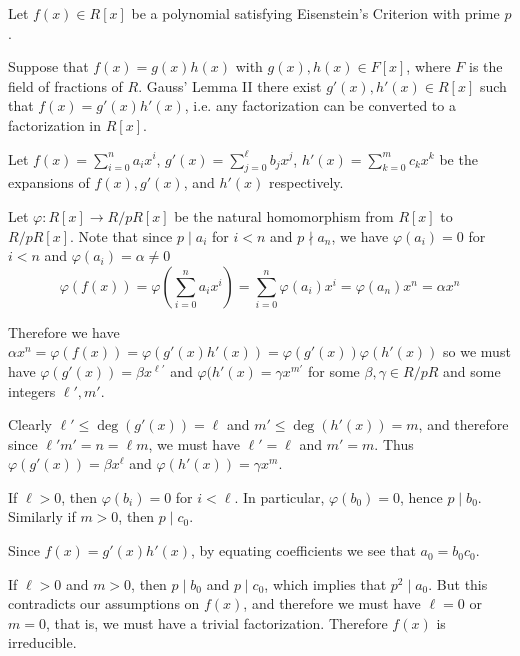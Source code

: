 \documentclass[12pt]{article}
\begin{document}
Let $f(x) \in R[x]$ be a polynomial satisfying Eisenstein's Criterion with prime $p$.

Suppose that $f(x)=g(x)h(x)$ with $g(x), h(x) \in F[x]$, where $F$ is the field of fractions of $R$.  Gauss' Lemma II  there exist $g'(x), h'(x) \in R[x]$ such that $f(x)=g'(x)h'(x)$, i.e. any factorization can be converted to a factorization in $R[x]$.

Let $f(x) = \sum_{i=0}^n a_i x^i$, $g'(x)= \sum_{j=0}^\ell b_j x^j$,
$h'(x)= \sum_{k=0}^m c_k x^k$ be the expansions of $f(x), g'(x)$, and $h'(x)$ respectively.

Let $\varphi : R[x] \rightarrow R/pR[x]$ be the natural homomorphism from $R[x]$ to $R/pR[x]$.  Note that since $p \mid a_i$ for $i<n$ and $p \nmid a_n$, we have $\varphi(a_i)=0$ for $i < n$ and $\varphi(a_i)=\alpha \neq 0$
\[ \varphi(f(x)) = \varphi \left(\sum_{i=0}^n a_i x^i \right)
     = \sum_{i=0}^n \varphi(a_i) x^i = \varphi(a_n) x^n = \alpha x^n \]

Therefore we have $\alpha x^n = \varphi(f(x))=\varphi(g'(x)h'(x))=\varphi(g'(x))\varphi(h'(x))$ so we must have $\varphi(g'(x))=\beta x^{\ell'}$ and $\varphi(h'(x)=\gamma x^{m'}$ for some $\beta, \gamma \in R/pR$ and some integers $\ell', m'$.

Clearly $\ell' \leq \deg(g'(x))=\ell$ and $m' \leq \deg(h'(x))=m$, and therefore since $\ell' m' = n = \ell m$, we must have $\ell'=\ell$ and $m'=m$.
Thus $\varphi(g'(x))=\beta x^\ell$ and $\varphi(h'(x))=\gamma x^m$.

If $\ell>0$, then $\varphi(b_i)=0$ for $i<\ell$.  In particular, $\varphi(b_0)=0$, hence $p \mid b_0$.  Similarly if $m>0$, then $p \mid c_0$.

Since $f(x)=g'(x)h'(x)$, by equating coefficients we see that $a_0 = b_0 c_0$.

If $\ell>0$ and $m>0$, then $p \mid b_0$ and $p \mid c_0$, which implies that $p^2 \mid a_0$.  But this contradicts our assumptions on $f(x)$, and therefore we must have $\ell=0$ or $m=0$, that is, we must have a trivial factorization.  Therefore $f(x)$ is irreducible.
\end{document}

